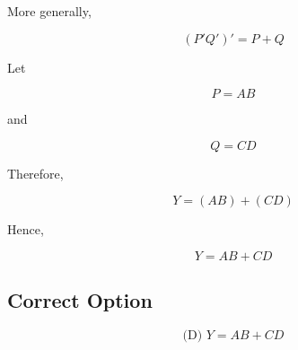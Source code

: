 \documentclass[12pt]{article}
\begin{document}
More generally,

\begin{equation}
(P'Q')' = P + Q
\end{equation}

Let

\begin{equation}
P = AB
\end{equation}

and

\begin{equation}
Q = CD
\end{equation}

Therefore,

\begin{equation}
Y = (AB) + (CD)
\end{equation}

Hence,

\begin{equation}
Y = AB + CD
\end{equation}

\subsection*{Correct Option}

\begin{equation}
\text{(D) } Y = AB + CD
\end{equation}
\end{document}
